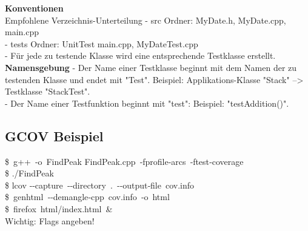 \begin{figure}
	\centering
\end{figure}


\textbf{Konventionen} \\
 Empfohlene Verzeichnis-Unterteilung
- src Ordner: MyDate.h,  MyDate.cpp, main.cpp \\
- tests Ordner: UnitTest main.cpp, MyDateTest.cpp \\
- Für jede zu testende Klasse wird eine entsprechende Testklasse erstellt.
\textbf{Namensgebung}
- Der Name einer Testklasse beginnt mit dem Namen der zu testenden Klasse und endet mit "Test". Beispiel: Applikations-Klasse "Stack" --> Testklasse "StackTest". \\
- Der Name einer Testfunktion beginnt mit "test": Beispiel: "testAddition()".

\subsection{GCOV Beispiel}
\$ g++ ‐o FindPeak FindPeak.cpp ‐fprofile‐arcs ‐ftest‐coverage \\
\$ ./FindPeak \\
\$ lcov ‐‐capture ‐‐directory . ‐‐output‐file cov.info \\
\$ genhtml ‐‐demangle‐cpp cov.info ‐o html \\
\$ firefox html/index.html \& \\
Wichtig: Flags angeben!

